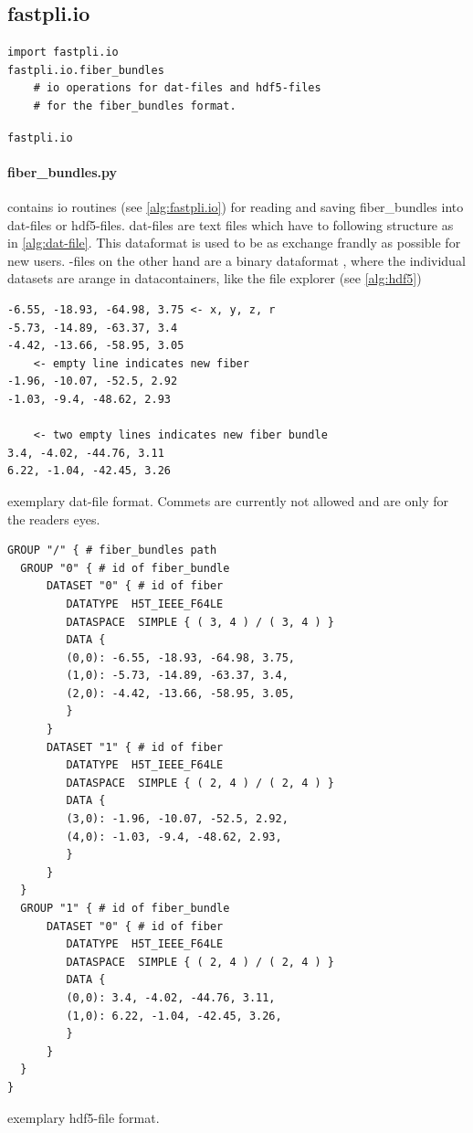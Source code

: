 \subsection{fastpli.io}
\begin{lstfloat}[!t]
\lstset{style=python}
\begin{lstlisting}
import fastpli.io
fastpli.io.fiber_bundles
    # io operations for dat-files and hdf5-files
    # for the fiber_bundles format.
\end{lstlisting}
\caption{\texttt{fastpli.io}}\label{alg:fastpli.io}
\end{lstfloat}
% 
\paragraph{fiber\_bundles.py} contains io routines (see \cref{alg:fastpli.io}) for reading and saving fiber\_bundles into dat-files or hdf5-files. dat-files are text files which have to following structure as in \cref{alg:dat-file}. This dataformat is used to be as exchange frandly as possible for new users. \hdf-files on the other hand are a binary dataformat \cite{hdf5}, where the individual datasets are arange in datacontainers, like the file explorer (see \cref{alg:hdf5})
% 
\begin{lstfloat}[!t]
\begin{lstlisting}
-6.55, -18.93, -64.98, 3.75 <- x, y, z, r
-5.73, -14.89, -63.37, 3.4
-4.42, -13.66, -58.95, 3.05
    <- empty line indicates new fiber
-1.96, -10.07, -52.5, 2.92
-1.03, -9.4, -48.62, 2.93

    <- two empty lines indicates new fiber bundle
3.4, -4.02, -44.76, 3.11
6.22, -1.04, -42.45, 3.26
\end{lstlisting}
\caption{exemplary dat-file format. Commets are currently not allowed and are only for the readers eyes.}\label{alg:dat-file}
\end{lstfloat}
% 
\begin{lstfloat}[!t]
\lstset{style=common}
\begin{lstlisting}
GROUP "/" { # fiber_bundles path
  GROUP "0" { # id of fiber_bundle
      DATASET "0" { # id of fiber
         DATATYPE  H5T_IEEE_F64LE
         DATASPACE  SIMPLE { ( 3, 4 ) / ( 3, 4 ) }
         DATA {
         (0,0): -6.55, -18.93, -64.98, 3.75,
         (1,0): -5.73, -14.89, -63.37, 3.4,
         (2,0): -4.42, -13.66, -58.95, 3.05,
         }
      }
      DATASET "1" { # id of fiber
         DATATYPE  H5T_IEEE_F64LE
         DATASPACE  SIMPLE { ( 2, 4 ) / ( 2, 4 ) }
         DATA {
         (3,0): -1.96, -10.07, -52.5, 2.92,
         (4,0): -1.03, -9.4, -48.62, 2.93,
         }
      }
  }
  GROUP "1" { # id of fiber_bundle
      DATASET "0" { # id of fiber
         DATATYPE  H5T_IEEE_F64LE
         DATASPACE  SIMPLE { ( 2, 4 ) / ( 2, 4 ) }
         DATA {
         (0,0): 3.4, -4.02, -44.76, 3.11,
         (1,0): 6.22, -1.04, -42.45, 3.26,
         }
      }
  }
}
\end{lstlisting}
\caption{exemplary hdf5-file format.} \label{alg:hdf5}
\end{lstfloat}
% 
% 
